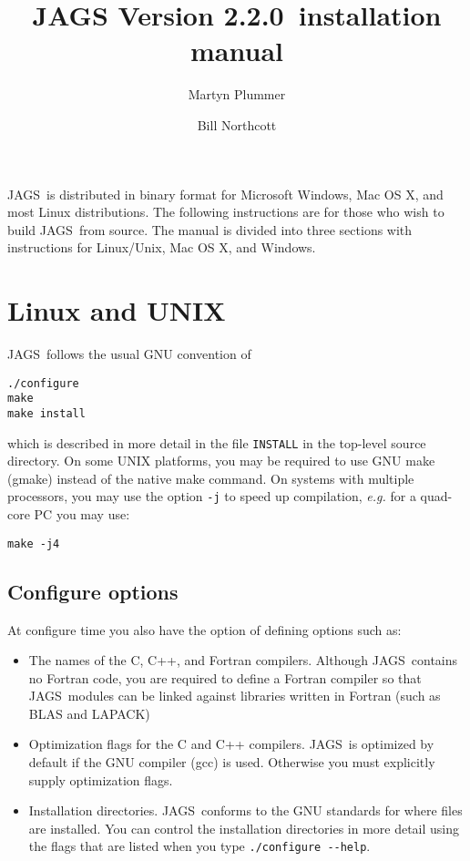 \documentclass[11pt, a4paper, titlepage]{article}
\newcommand{\release}{2.2.0}
\newcommand{\JAGS}{\textsf{JAGS}}
\begin{document}
\title{JAGS Version \release\ installation manual}
\author{Martyn Plummer \and Bill Northcott}
\maketitle

\JAGS\ is distributed in binary format for Microsoft Windows, Mac OS
X, and most Linux distributions.  The following instructions are for
those who wish to build \JAGS\ from source. The manual is divided
into three sections with instructions for Linux/Unix, Mac OS X, and Windows.

\section{Linux and UNIX}

\JAGS\ follows the usual GNU convention of 
\begin{verbatim}
./configure
make
make install
\end{verbatim}
which is described in more detail in the file \texttt{INSTALL} in
the top-level source directory. On some UNIX platforms, you may
be required to use GNU make (gmake) instead of the native make
command. On systems with multiple processors, you may use the option 
\verb+-j+ to speed up compilation, {\em e.g.} for a quad-core PC you
may use:
\begin{verbatim}
make -j4
\end{verbatim}

\subsection{Configure options}

At configure time you also have the option of defining options such
as:
\begin{itemize}
\item The names of the C, C++, and Fortran compilers.  Although
  \JAGS\ contains no Fortran code, you are required to define a
  Fortran compiler so that \JAGS\ modules can be linked against
  libraries written in Fortran (such as BLAS and LAPACK)
\item Optimization flags for the C and C++ compilers.  \JAGS\ is
  optimized by default if the GNU compiler (gcc) is used. Otherwise
  you must explicitly supply optimization flags.
\item Installation directories. \JAGS\ conforms to the GNU standards
  for where files are installed. You can control the installation
  directories in more detail using the flags that are listed when
  you type \verb+./configure --help+.
\end{itemize}
\end{document}
